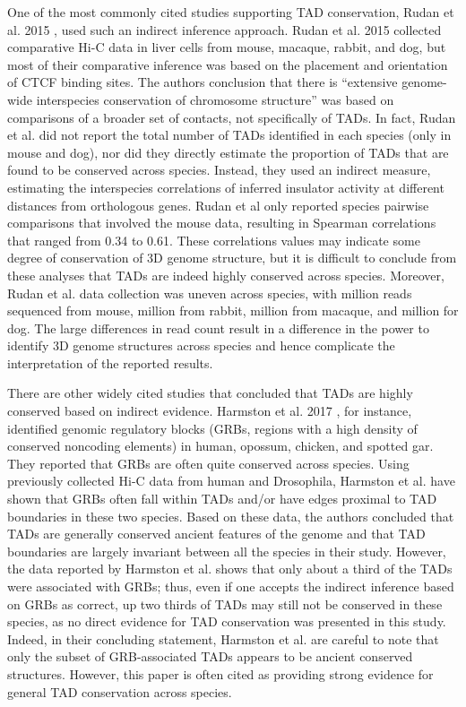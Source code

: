 One of the most commonly cited studies supporting TAD conservation, Rudan et al. 2015 \cite{Rudan.2015}, used such an indirect inference approach. Rudan et al. 2015 \cite{Rudan.2015} collected comparative Hi-C data in liver cells from mouse, macaque, rabbit, and dog, but most of their comparative inference was based on the placement and orientation of CTCF binding sites. The authors conclusion that there is ``extensive genome-wide interspecies conservation of chromosome structure'' was based on comparisons of a broader set of contacts, not specifically of TADs. In fact, Rudan et al. did not report the total number of TADs identified in each species (only in mouse and dog), nor did they directly estimate the proportion of TADs that are found to be conserved across species. Instead, they used an indirect measure, estimating the interspecies correlations of inferred insulator activity \cite{Sofueva.2013} at different distances from orthologous genes. Rudan et al only reported species pairwise comparisons that involved the mouse data, resulting in Spearman correlations that ranged from 0.34 to 0.61. These correlations values may indicate some degree of conservation of 3D genome structure, but it is difficult to conclude from these analyses that TADs are indeed highly conserved across species. Moreover, Rudan et al. data collection was uneven across species, with  million reads sequenced from mouse,  million from rabbit,  million from macaque, and  million for dog. The large differences in read count result in a difference in the power to identify 3D genome structures across species and hence complicate the interpretation of the reported results. 

There are other widely cited studies that concluded that TADs are highly conserved based on indirect evidence. Harmston et al. 2017 \cite{Harmston.2017}, for instance, identified genomic regulatory blocks (GRBs, regions with a high density of conserved noncoding elements) in human, opossum, chicken, and spotted gar. They reported that GRBs are often quite conserved across species. Using previously collected Hi-C data from human and Drosophila, Harmston et al. have shown that GRBs often fall within TADs and/or have edges proximal to TAD boundaries in these two species. Based on these data, the authors concluded that TADs are generally conserved ancient features of the genome and that TAD boundaries are largely invariant between all  the species in their study. However, the data reported by Harmston et al. shows that only about a third of the TADs were associated with GRBs; thus, even if one accepts the indirect inference based on GRBs as correct, up two thirds of TADs may still not be conserved in these species, as no direct evidence for TAD conservation was presented in this study. Indeed, in their concluding statement, Harmston et al. are careful to note that only the subset of GRB-associated TADs appears to be ancient conserved structures. However, this paper is often cited as providing strong evidence for general TAD conservation across species.  

